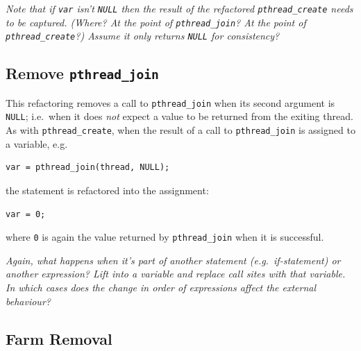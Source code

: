 \documentclass{llncs}
\begin{document}

\emph{Note that if \lstinline|var| \emph{isn't} \lstinline|NULL| then the result of the refactored \lstinline|pthread_create| needs to be captured. (Where? At the point of \lstinline|pthread_join|? At the point of \lstinline|pthread_create|?) Assume it only returns \lstinline|NULL| for consistency?}

\subsection{Remove \lstinline|pthread_join|}

This refactoring removes a call to \lstinline|pthread_join| when its second argument is \lstinline|NULL|; i.e.\ when it does \emph{not} expect a value to be returned from the exiting thread. As with \lstinline|pthread_create|, when the result of a call to \lstinline|pthread_join| is assigned to a variable, e.g.\

\begin{lstlisting}[frame=single]
var = pthread_join(thread, NULL);
\end{lstlisting}

\noindent
the statement is refactored into the assignment:

\begin{lstlisting}[frame=single]
var = 0;
\end{lstlisting}

\noindent
where \lstinline|0| is again the value returned by \lstinline|pthread_join| when it is successful. 

\emph{Again, what happens when it's part of another statement (e.g.\ if-statement) or another expression? Lift into a variable and replace call sites with that variable. In which cases does the change in order of expressions affect the external behaviour?}

\subsection{Farm Removal}
\end{document}
